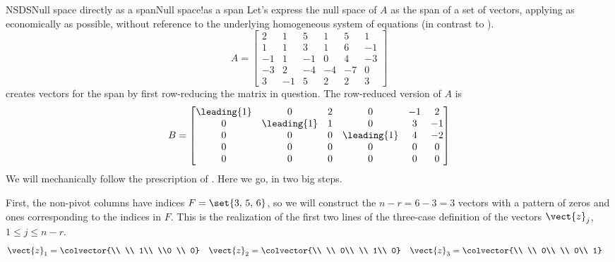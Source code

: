 \begin{example}{NSDS}{Null space directly as a span}{Null space!as a span}
Let's express the null space of $A$ as the span of a set of vectors, applying  as economically as possible, without reference to the underlying homogeneous system of equations (in contrast to ).
%
\begin{equation*}
A=
\begin{bmatrix}
 2 & 1 & 5 & 1 & 5 & 1 \\
 1 & 1 & 3 & 1 & 6 & -1 \\
 -1 & 1 & -1 & 0 & 4 & -3 \\
 -3 & 2 & -4 & -4 & -7 & 0 \\
 3 & -1 & 5 & 2 & 2 & 3
\end{bmatrix}
\end{equation*}
%
 creates vectors for the span by first row-reducing the matrix in question.  The row-reduced version of $A$ is
%
\begin{equation*}
B=
\begin{bmatrix}
 \leading{1} & 0 & 2 & 0 & -1 & 2 \\
 0 & \leading{1} & 1 & 0 & 3 & -1 \\
 0 & 0 & 0 & \leading{1} & 4 & -2 \\
 0 & 0 & 0 & 0 & 0 & 0 \\
 0 & 0 & 0 & 0 & 0 & 0
\end{bmatrix}
\end{equation*}
%
We will mechanically follow the prescription of .  Here we go, in two big steps. \par
%
First, the non-pivot columns have indices $F=\set{3,\,5,\,6}$, so we will construct the $n-r=6-3=3$ vectors with a pattern of zeros and ones corresponding to the indices in $F$.  This is the realization of the first two lines of the three-case definition of the vectors $\vect{z}_j$, $1\leq j\leq n-r$.
%
\begin{align*}
\vect{z}_1&=\colvector{\\ \\ 1\\ \\0 \\ 0}
&
\vect{z}_2&=\colvector{\\ \\ 0\\ \\ 1\\ 0}
&
\vect{z}_3&=\colvector{\\ \\ 0\\ \\ 0\\ 1}

\end{align*}
\end{example}
